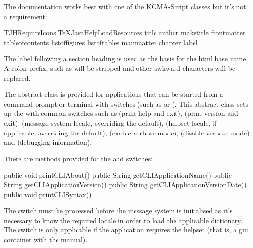 \documentclass[toc=listof]{scrreport}
\begin{document}
The documentation works best with one of the KOMA-Script classes but
it's not a requirement:
\begin{codebox*}
\gls{TJHRequireIcons}
\gls{TeXJavaHelpLoadResources}
\gls{title}
\gls{author}
\gls{maketitle}
\gls{frontmatter}
\gls{tableofcontents}
\gls{listoffigures}
\gls{listoftables}
\gls{mainmatter}
\gls{chapter}
\gls{label}
\end{codebox*}
The label following a section heading is used as the basis for the
\gls{html} base name. A colon prefix, such as  will be
stripped and other awkward characters will be replaced.

The abstract class  is provided for applications
that can be started from a command prompt or terminal with switches
(such as  or ). This abstract class
sets up the  with common switches
such as  (print help and exit), 
 (print version and exit),
 (message system locale, overriding the default),
 (helpset locale, if applicable, overriding the default),
 (enable verbose mode), 
 (disable verbose mode) and 
 (debugging information).

There are methods provided for the  and  switches:
\begin{codebox}
public void printCLIAbout()
public String getCLIApplicationName()
public String getCLIApplicationVersion()
public String getCLIApplicationVersionDate()
public void printCLISyntax()
\end{codebox}

The  switch must be processed before the message
system is initialised as it's necessary to know the required locale
in order to load the applicable dictionary.
The  switch is only applicable if the application
requires the helpset (that is, a \gls{gui} container with the manual).
\end{document}
